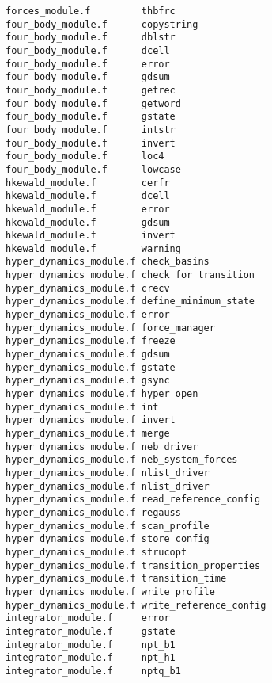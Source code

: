 \begin{verbatim}
forces_module.f         thbfrc                    
four_body_module.f      copystring                
four_body_module.f      dblstr                    
four_body_module.f      dcell                     
four_body_module.f      error                     
four_body_module.f      gdsum                     
four_body_module.f      getrec                    
four_body_module.f      getword                   
four_body_module.f      gstate                    
four_body_module.f      intstr                    
four_body_module.f      invert                    
four_body_module.f      loc4                      
four_body_module.f      lowcase                   
hkewald_module.f        cerfr                     
hkewald_module.f        dcell                     
hkewald_module.f        error                     
hkewald_module.f        gdsum                     
hkewald_module.f        invert                    
hkewald_module.f        warning                   
hyper_dynamics_module.f check_basins              
hyper_dynamics_module.f check_for_transition      
hyper_dynamics_module.f crecv                     
hyper_dynamics_module.f define_minimum_state      
hyper_dynamics_module.f error                     
hyper_dynamics_module.f force_manager             
hyper_dynamics_module.f freeze                    
hyper_dynamics_module.f gdsum                     
hyper_dynamics_module.f gstate                    
hyper_dynamics_module.f gsync                     
hyper_dynamics_module.f hyper_open                
hyper_dynamics_module.f int                       
hyper_dynamics_module.f invert                    
hyper_dynamics_module.f merge                     
hyper_dynamics_module.f neb_driver                
hyper_dynamics_module.f neb_system_forces         
hyper_dynamics_module.f nlist_driver              
hyper_dynamics_module.f nlist_driver              
hyper_dynamics_module.f read_reference_config     
hyper_dynamics_module.f regauss                   
hyper_dynamics_module.f scan_profile              
hyper_dynamics_module.f store_config              
hyper_dynamics_module.f strucopt                  
hyper_dynamics_module.f transition_properties     
hyper_dynamics_module.f transition_time           
hyper_dynamics_module.f write_profile             
hyper_dynamics_module.f write_reference_config    
integrator_module.f     error                     
integrator_module.f     gstate                    
integrator_module.f     npt_b1                    
integrator_module.f     npt_h1                    
integrator_module.f     nptq_b1                   

\end{verbatim}
